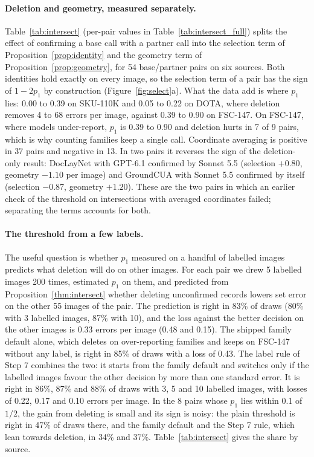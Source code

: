 

\paragraph{Deletion and geometry, measured separately.} Table~\ref{tab:intersect} (per-pair values in Table~\ref{tab:intersect_full}) splits the effect of confirming a base call with a partner call into the selection term of Proposition~\ref{prop:identity} and the geometry term of Proposition~\ref{prop:geometry}, for 54 base/partner pairs on six sources. Both identities hold exactly on every image, so the selection term of a pair has the sign of $1-2p_1$ by construction (Figure~\ref{fig:select}a). What the data add is where $p_1$ lies: 0.00 to 0.39 on SKU-110K and 0.05 to 0.22 on DOTA, where deletion removes 4 to 68 errors per image, against 0.39 to 0.90 on FSC-147. On FSC-147, where models under-report, $p_1$ is 0.39 to 0.90 and deletion hurts in 7 of 9 pairs, which is why counting families keep a single call. Coordinate averaging is positive in 37 pairs and negative in 13. In two pairs it reverses the sign of the deletion-only result: DocLayNet with GPT-6.1 confirmed by Sonnet 5.5 (selection $+0.80$, geometry $-1.10$ per image) and GroundCUA with Sonnet 5.5 confirmed by itself (selection $-0.87$, geometry $+1.20$). These are the two pairs in which an earlier check of the threshold on intersections with averaged coordinates failed; separating the terms accounts for both.

\paragraph{The threshold from a few labels.} The useful question is whether $p_1$ measured on a handful of labelled images predicts what deletion will do on other images. For each pair we drew 5 labelled images 200 times, estimated $p_1$ on them, and predicted from Proposition~\ref{thm:intersect} whether deleting unconfirmed records lowers set error on the other 55 images of the pair. The prediction is right in 83\% of draws (80\% with 3 labelled images, 87\% with 10), and the loss against the better decision on the other images is 0.33 errors per image (0.48 and 0.15). The shipped family default alone, which deletes on over-reporting families and keeps on FSC-147 without any label, is right in 85\% of draws with a loss of 0.43. The label rule of Step 7 combines the two: it starts from the family default and switches only if the labelled images favour the other decision by more than one standard error. It is right in 86\%, 87\% and 88\% of draws with 3, 5 and 10 labelled images, with losses of 0.22, 0.17 and 0.10 errors per image. In the 8 pairs whose $p_1$ lies within 0.1 of $1/2$, the gain from deleting is small and its sign is noisy: the plain threshold is right in 47\% of draws there, and the family default and the Step 7 rule, which lean towards deletion, in 34\% and 37\%. Table~\ref{tab:intersect} gives the share by source.

